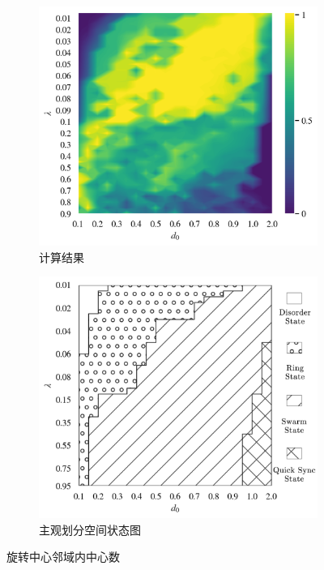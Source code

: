 \documentclass{article}
\begin{document}
\vspace{-0.5cm}
\begin{figure}[H]
	\centering
	\begin{subfigure}[b]{0.49\textwidth}
		\includegraphics[width=\textwidth]{./figs/nearbyNums.png}
		\vspace{-1cm}
		\caption{计算结果}
		
	\end{subfigure}
	\begin{subfigure}[b]{0.49\textwidth}
		\includegraphics[width=\textwidth]{./figs/subjectiveOp3.png}
		\vspace{-1cm}
		\caption{主观划分空间状态图}
	\end{subfigure}
	\vspace{-0.5cm}
	\caption{旋转中心邻域内中心数}
	\label{fig:fig234c.7.1}
\end{figure}
\end{document}
